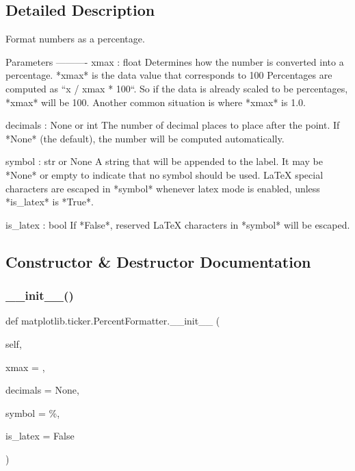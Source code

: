 \subsection{Detailed Description}
\begin{DoxyVerb}Format numbers as a percentage.

Parameters
----------
xmax : float
    Determines how the number is converted into a percentage.
    *xmax* is the data value that corresponds to 100%
    Percentages are computed as ``x / xmax * 100``. So if the data is
    already scaled to be percentages, *xmax* will be 100. Another common
    situation is where *xmax* is 1.0.

decimals : None or int
    The number of decimal places to place after the point.
    If *None* (the default), the number will be computed automatically.

symbol : str or None
    A string that will be appended to the label. It may be
    *None* or empty to indicate that no symbol should be used. LaTeX
    special characters are escaped in *symbol* whenever latex mode is
    enabled, unless *is_latex* is *True*.

is_latex : bool
    If *False*, reserved LaTeX characters in *symbol* will be escaped.
\end{DoxyVerb}
 

\subsection{Constructor \& Destructor Documentation}
\mbox{\label{classmatplotlib_1_1ticker_1_1PercentFormatter_a8e38268a75407946f8f8ce4d98dad562}} 
\subsubsection{\texorpdfstring{\+\_\+\+\_\+init\+\_\+\+\_\+()}{\_\_init\_\_()}}
{\footnotesize\ttfamily def matplotlib.\+ticker.\+Percent\+Formatter.\+\_\+\+\_\+init\+\_\+\+\_\+ (\begin{DoxyParamCaption}\item[{}]{self,  }\item[{}]{xmax = {},  }\item[{}]{decimals = {\ttfamily None},  }\item[{}]{symbol = {\ttfamily \textquotesingle{}\%\textquotesingle{}},  }\item[{}]{is\+\_\+latex = {\ttfamily False} }\end{DoxyParamCaption})}



